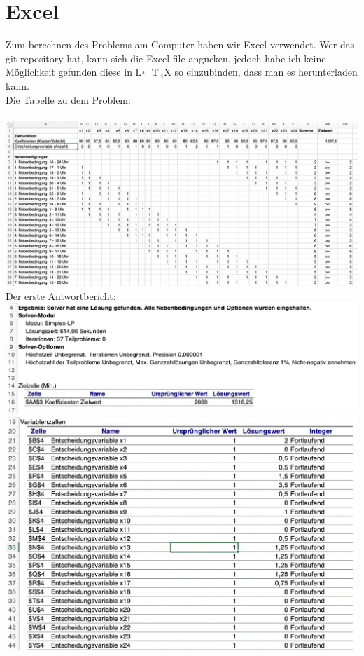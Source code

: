 \section{Excel}
Zum berechnen des Problems am Computer haben wir Excel verwendet. Wer das git repository hat, kann sich die Excel file angucken, jedoch habe ich keine Möglichkeit gefunden diese in
${\displaystyle \mathrm {L\!\!^{{}_{A}}\!\!\!\!\!\;\;T\!_{\displaystyle E}\!X}}$ 
so einzubinden, dass man es herunterladen kann.\\
Die Tabelle zu dem Problem:\\\\
\includegraphics[width=17cm,left]{images/SimplexTabelle.png}\\
Der erste Antwortbericht:\\
\includegraphics[width=17cm,left]{images/Antwortbericht11.png}
\includegraphics[width=17cm,left]{images/Antwortbericht12.png}
